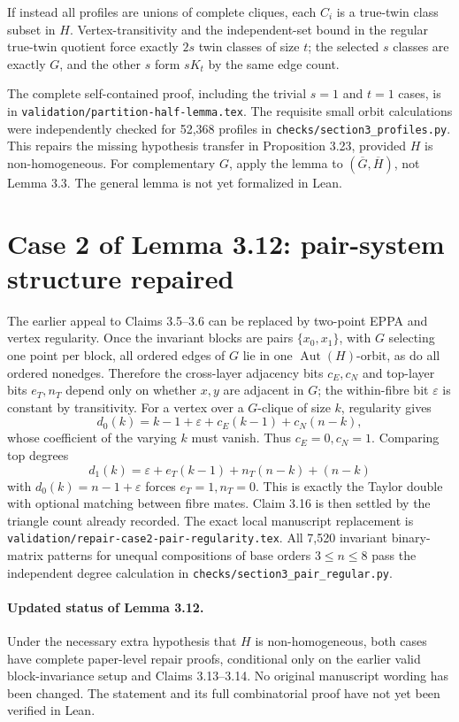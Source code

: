 \documentclass{article}
\begin{document}
If instead all profiles are unions of complete cliques,
each \(C_i\) is a true-twin class subset in \(H\).
Vertex-transitivity and the independent-set bound in the
regular true-twin quotient force exactly \(2s\) twin
classes of size \(t\); the selected \(s\) classes
are exactly \(G\), and the other \(s\) form \(sK_t\)
by the same edge count.

The complete self-contained proof, including the
trivial \(s=1\) and \(t=1\) cases, is in
\texttt{validation/partition-half-lemma.tex}.
The requisite small orbit calculations were independently
checked for 52,368 profiles in
\texttt{checks/section3\_profiles.py}.
This repairs the missing hypothesis transfer in
Proposition 3.23, provided \(H\) is non-homogeneous.
For complementary \(G\), apply the lemma to
\((\overline G,\overline H)\), not Lemma 3.3.
The general lemma is not yet formalized in Lean.

\section*{Case 2 of Lemma 3.12: pair-system structure repaired}
The earlier appeal to Claims 3.5--3.6 can be
replaced by two-point EPPA and vertex regularity.
Once the invariant blocks are pairs
\(\{x_0,x_1\}\), with \(G\) selecting one
point per block, all ordered edges of \(G\)
lie in one \(\operatorname{Aut}(H)\)-orbit, as
do all ordered nonedges. Therefore the
cross-layer adjacency bits \(c_E,c_N\)
and top-layer bits \(e_T,n_T\) depend only
on whether \(x,y\) are adjacent in \(G\);
the within-fibre bit \(\varepsilon\) is constant
by transitivity.
For a vertex over a \(G\)-clique of size \(k\),
regularity gives
\[
d_0(k)=k-1+\varepsilon+c_E(k-1)+c_N(n-k),
\]
whose coefficient of the varying \(k\)
must vanish. Thus \(c_E=0,c_N=1\).
Comparing top degrees
\[
d_1(k)=\varepsilon+e_T(k-1)+n_T(n-k)+(n-k)
\]
with \(d_0(k)=n-1+\varepsilon\)
forces \(e_T=1,n_T=0\).
This is exactly the Taylor double with
optional matching between fibre mates.
Claim 3.16 is then settled by the
triangle count already recorded.
The exact local manuscript replacement is
\texttt{validation/repair-case2-pair-regularity.tex}.
All 7,520 invariant binary-matrix patterns
for unequal compositions of base orders
\(3\le n\le8\) pass the independent
degree calculation in
\texttt{checks/section3\_pair\_regular.py}.

\paragraph{Updated status of Lemma 3.12.}
Under the necessary extra hypothesis that
\(H\) is non-homogeneous, both cases have
complete paper-level repair proofs, conditional
only on the earlier valid block-invariance
setup and Claims 3.13--3.14. No original
manuscript wording has been changed.
The statement and its full combinatorial
proof have not yet been verified in Lean.
\end{document}
